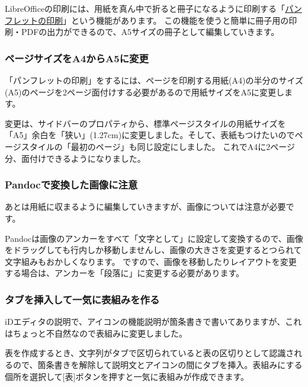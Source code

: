 \documentclass[]{article}
\begin{document}
LibreOfficeの印刷には、用紙を真ん中で折ると冊子になるように印刷する「\href{https://help.libreoffice.org/Writer/Printing_a_Brochure/ja}{パンフレットの印刷}」という機能があります。
この機能を使うと簡単に冊子用の印刷・PDFの出力ができるので、A5サイズの冊子として編集していきます。

\subsubsection{ページサイズをA4からA5に変更}\label{ux30daux30fcux30b8ux30b5ux30a4ux30baux3092a4ux304bux3089a5ux306bux5909ux66f4}

「パンフレットの印刷」をするには、ページを印刷する用紙(A4)の半分のサイズ(A5)のページを2ページ面付けする必要があるので用紙サイズをA5に変更します。

変更は、サイドバーのプロパティから、標準ページスタイルの用紙サイズを「A5」余白を「狭い」(1.27cm)に変更しました。そして、表紙もつけたいのでページスタイルの「最初のページ」も同じ設定にしました。
これでA4に2ページ分、面付けできるようになりました。

\subsubsection{Pandocで変換した画像に注意}\label{pandocux3067ux5909ux63dbux3057ux305fux753bux50cfux306bux6ce8ux610f}

あとは用紙に収まるように編集していきますが、画像については注意が必要です。

Pandocは画像のアンカーをすべて「文字として」に設定して変換するので、画像をドラッグしても行内しか移動しませんし、画像の大きさを変更するとつられて文字組みもおかしくなります。
ですので、画像を移動したりレイアウトを変更する場合は、アンカーを「段落に」に変更する必要があります。

\subsubsection{タブを挿入して一気に表組みを作る}\label{ux30bfux30d6ux3092ux633fux5165ux3057ux3066ux4e00ux6c17ux306bux8868ux7d44ux307fux3092ux4f5cux308b}

iDエディタの説明で、アイコンの機能説明が箇条書きで書いてありますが、これはちょっと不自然なので表組みに変更しました。

表を作成するとき、文字列がタブで区切られていると表の区切りとして認識されるので、箇条書きを解除して説明文とアイコンの間にタブを挿入。表組みにする個所を選択して{[}表{]}ボタンを押すと一気に表組みが作成できます。
\end{document}

